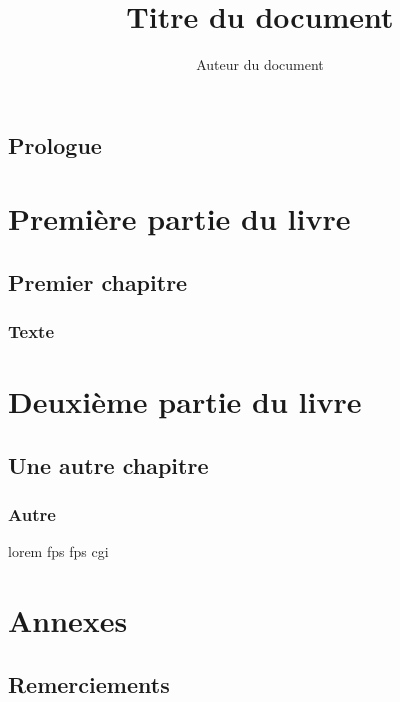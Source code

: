 \documentclass[10pt,a4paper,french]{book}
\begin{document}
\title{Titre du document}
\author{Auteur du document}
\maketitle


\tableofcontents

\frontmatter %
\chapter{Prologue}

\mainmatter %

\part{Première partie du livre}
\chapter{Premier chapitre}
\section{Texte}

\part{Deuxième partie du livre}
\chapter{Une autre chapitre}
\section{Autre}
\gls{lorem} \gls{fps} \gls{fps} \gls{cgi}

\appendix %
\part{Annexes}

\chapter{Remerciements}

\backmatter %

\cprintindex
\cprintglossaries
\end{document}
